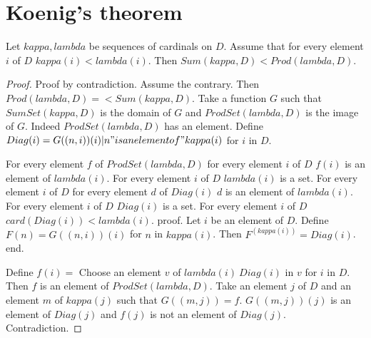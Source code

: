 \documentclass{document}
\begin{document}
  \section*{Koenig's theorem}

  \begin{forthel}
    \begin{theorem}[Koenig]
      Let $kappa, lambda$ be sequences of cardinals on $D$. Assume that for every element $i$ of $D$ $kappa(i) < lambda(i)$. Then $Sum(kappa,D) < Prod(lambda,D)$.
    \end{theorem}
    \begin{proof}
      Proof by contradiction. Assume the contrary. Then $Prod(lambda,D) =<
      Sum(kappa,D)$. Take a function $G$ such that $SumSet(kappa,D)$ is the domain of $G$ and $ProdSet(lambda,D)$ is the image of $G$. Indeed $ProdSet(lambda, D)$ has an element. Define $Diag(i) = {G((n,i))(i) | n "is an element of" kappa(i)}$ for $i$ in $D$.

      For every element $f$ of $ProdSet(lambda, D)$ for every element $i$ of $D$ $f(i)$ is an element of $lambda(i)$.
      For every element $i$ of $D$ $lambda(i)$ is a set.
      For every element $i$ of $D$ for every element $d$ of $Diag(i)$ $d$ is an element of $lambda(i)$.
      For every element $i$ of $D$ $Diag(i)$ is a set.
      For every element $i$ of $D$ $card(Diag(i)) < lambda(i)$.
      proof.
        Let $i$ be an element of $D$. Define $F(n) = G((n,i))(i)$ for $n$ in $kappa(i)$. Then $F^(kappa(i)) = Diag(i)$.
      end.

      Define $f(i) =$ Choose an element $v$ of $lambda(i) \ Diag(i)$ in $v$ for $i$ in $D$. Then $f$ is an element of $ProdSet(lambda,D)$. Take an element $j$ of $D$ and an element $m$ of $kappa(j)$ such that $G((m,j)) = f$. $G((m,j))(j)$ is an element of $Diag(j)$ and $f(j)$ is not an element of $Diag(j)$. Contradiction.
    \end{proof}
  \end{forthel}
\end{document}
